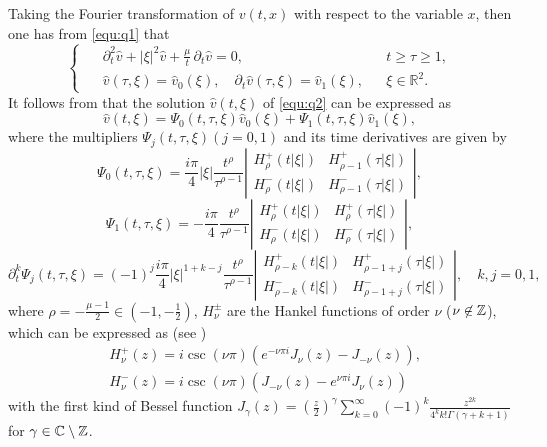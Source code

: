 \documentclass[11pt,twoside]{article}
\newcommand{\R}{\mathbb R}
\newcommand{\p}{\partial}
\newcommand{\f}{\frac}
\theoremstyle{plain}
\theoremstyle{definition}
\theoremstyle{remark}
\numberwithin{equation}{section}
\begin{document}
Taking the Fourier transformation of $v(t,x)$ with respect to the variable $x$, then
one has from \eqref{equ:q1} that
\begin{equation}\label{equ:q2}
\left\{ \enspace
\begin{aligned}
&\partial_t^2 \hat{v} +|\xi|^{2} \hat{v} +\f{\mu}{t}\,\p_t\hat{v}=0, &&
t\geq \tau \geq 1,\\
&\hat{v}(\tau,\xi)=\hat{v}_0(\xi), \quad \partial_{t} \hat{v}(\tau,\xi)=\hat{v}_1(\xi), &&\xi\in\R^2.
\end{aligned}
\right.
\end{equation}
It follows from   \cite[Theorem 2.1]{Wirth-3} that the solution $\hat{v}(t, \xi)$ of
\eqref{equ:q2} can be expressed as
\begin{equation}\label{equ:q4}
\hat{v}(t, \xi)=\Psi_{0}(t, \tau, \xi) \hat{v}_{0}(\xi)+\Psi_{1}(t, \tau, \xi) \hat{v}_{1}(\xi),
\end{equation}
where the multipliers $\Psi_{j}(t, \tau, \xi)(j=0,1)$ and its time derivatives are given by
\begin{equation}\label{equ:q5}
\Psi_{0}(t, \tau, \xi)=\frac{i \pi}{4}|\xi| \frac{t^{\rho}}{\tau^{\rho-1}}\left|\begin{array}{ll}
H_{\rho}^{+}(t|\xi|) & H_{\rho-1}^{+}(\tau|\xi|) \\
H_{\rho}^{-}(t|\xi|) & H_{\rho-1}^{-}(\tau|\xi|)
\end{array}\right|,
\end{equation}
\begin{equation}\label{equ:q6}
\Psi_{1}(t, \tau, \xi)=-\frac{i \pi}{4} \frac{t^{\rho}}{\tau^{\rho-1}}\left|\begin{array}{ll}
H_{\rho}^{+}(t|\xi|) & H_{\rho}^{+}(\tau|\xi|) \\
H_{\rho}^{-}(t|\xi|) & H_{\rho}^{-}(\tau|\xi|)
\end{array}\right|,
\end{equation}
\begin{equation}\label{equ:q9}
\partial_{t}^{k} \Psi_{j}(t, \tau, \xi)=(-1)^{j} \frac{i \pi}{4}|\xi|^{1+k-j} \frac{t^{\rho}}{\tau^{\rho-1}}\left|\begin{array}{ll}
H_{\rho-k}^{+}(t|\xi|) & H_{\rho-1+j}^{+}(\tau|\xi|)  \\
H_{\rho-k}^{-}(t|\xi|) & H_{\rho-1+j}^{-}(\tau|\xi|)
\end{array}\right|,\quad  k,j=0,1,
\end{equation}
where $\rho=-\f{\mu-1}{2}\in (-1, -\f12)$, $H_{\nu}^{\pm}$ are the Hankel functions of order $\nu$ ($\nu\not\in\Bbb Z$),
which can be expressed as (see \cite[Section 10]{OLBC})
\begin{equation}\label{equ:q10}
\begin{aligned}
&H_{\nu}^{+}(z)=i \csc (\nu \pi)\left(e^{-\nu \pi i} J_{\nu}(z)-J_{-\nu}(z)\right),\\
&H_{\nu}^{-}(z)=i \csc (\nu\pi)\left(J_{-\nu}(z)-e^{\nu\pi i} J_{\nu}(z)\right)
\end{aligned}
\end{equation}
with the first kind of Bessel function $J_{\gamma}(z)=(\f{z}{2})^{\gamma}\sum_{k=0}^{\infty}(-1)^k\f{z^{2k}}{4^kk!\Gamma(\gamma+k+1)}$
for $\gamma\in \mathbb{C} \setminus \Bbb{Z}$.
\end{document}
